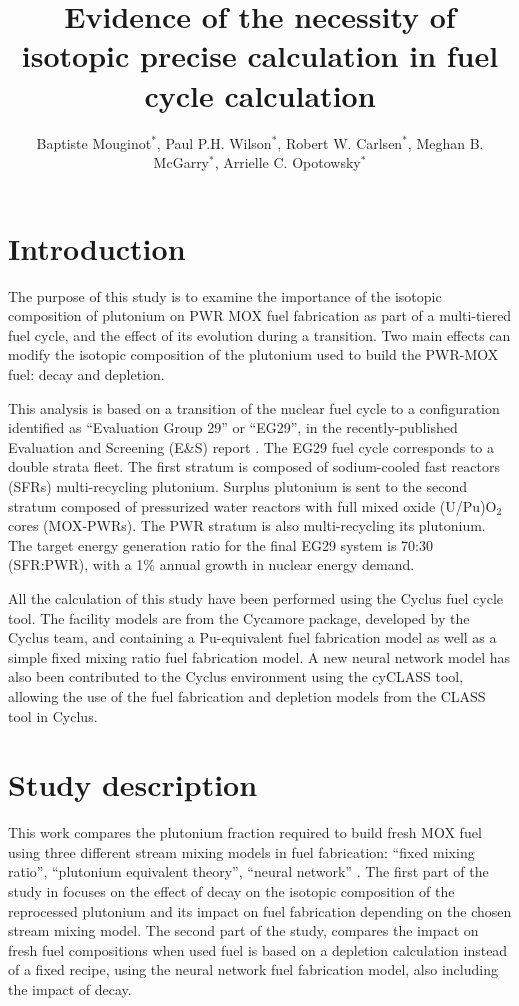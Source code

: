 \documentclass{anstrans}
\title{Evidence of the necessity of isotopic precise calculation in fuel cycle
calculation}
\author{Baptiste Mouginot$^{*}$, Paul P.H. Wilson$^{*}$, Robert W. Carlsen$^{*}$, Meghan B. McGarry$^{*}$,
Arrielle C. Opotowsky$^{*}$ }
\institute{
$^{*}$University of Wisconsin-Madison, WI
\and
}
\begin{document}
\section{Introduction} 

The purpose of this study is to examine the importance of the isotopic
composition of plutonium on PWR MOX fuel fabrication as part of a multi-tiered
fuel cycle, and the effect of its evolution during a transition. Two main
effects can modify the isotopic composition of the plutonium used to build the
PWR-MOX fuel: decay and depletion.

This analysis is based on a transition of the nuclear fuel cycle
to a configuration identified as ``Evaluation Group 29'' or ``EG29'', in the
recently-published Evaluation and Screening (E\&S) report \cite{ES}.  The EG29 fuel
cycle corresponds to a double strata fleet. The first stratum is composed of
sodium-cooled fast reactors (SFRs) multi-recycling plutonium. Surplus
plutonium is sent to the second stratum composed of pressurized water
reactors with full mixed oxide (U/Pu)O$_{2}$ cores (MOX-PWRs).  The PWR stratum
is also multi-recycling its plutonium. The target energy generation ratio for
the final EG29 system is 70:30 (SFR:PWR), with a 1\% annual growth in nuclear
energy demand.


All the calculation of this study have been performed using the Cyclus fuel cycle
tool\cite{CYCLUS}. The facility models are from the Cycamore package, developed by the
Cyclus team, and containing a Pu-equivalent fuel fabrication model as well as
a simple fixed mixing ratio fuel fabrication model. A new neural network model has
also been contributed to the Cyclus environment using the cyCLASS tool\cite{cyCLASS}, 
allowing the use of the fuel fabrication and depletion models from the CLASS tool
\cite{CLASS} in Cyclus.


\section{Study description}
This work compares the plutonium fraction required to build fresh MOX fuel
using three different stream mixing models in fuel fabrication: ``fixed mixing
ratio'', ``plutonium equivalent theory'', ``neural network'' \cite{CLASS_MLP}.
The first part of the study in focuses on the effect of decay on the isotopic
composition of the reprocessed plutonium and its impact on fuel fabrication
depending on the chosen stream mixing model.  The second part of the study,
compares the impact on fresh fuel compositions when used fuel is based on a
depletion calculation instead of a fixed recipe, using the neural network fuel
fabrication model, also including the impact of decay.
\end{document}
